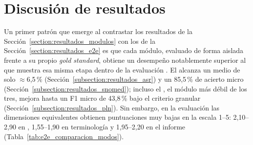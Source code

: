 
\section{Discusión de resultados}\label{section:discusion_resultados}

Un primer patrón que emerge al contrastar los resultados de la Sección~\ref{section:resultados_modulos}
con los de la Sección~\ref{section:resultados_e2e} es que cada módulo, evaluado de forma aislada
frente a su propio \textit{gold standard}, obtiene un desempeño notablemente superior al que muestra
esa misma etapa dentro de la evaluación . El  alcanza un
 medio de solo $\approx$6,5\,\% (Sección~\ref{subsection:resultados_asr}) y
 un 85,5\,\% de acierto micro
(Sección~\ref{subsection:resultados_snomed}); incluso el , el módulo más débil de
los tres, mejora hasta un F1 micro de 43,8\,\% bajo el criterio granular
(Sección~\ref{subsection:resultados_pln}). Sin embargo, en la evaluación 
las dimensiones equivalentes obtienen puntuaciones muy bajas en la escala 1--5: 2,10--2,90 en
, 1,55--1,90 en terminología y 1,95--2,20 en el informe 
(Tabla~\ref{tab:e2e_comparacion_modos}).

